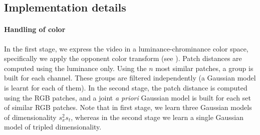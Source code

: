 \documentclass[10pt, a4paper]{article}
\begin{document}

\subsection{Implementation details}
\label{sse:implementation}

\paragraph{Handling of color} %
%
In the first stage, we express the video in a luminance-chrominance color space,
specifically we apply the opponent color transform (see \cite{Dabov2007tip,Lebrun2013a}).
Patch distances are computed using the luminance only. Using the 
$n$ most similar patches, a group is built for each channel. These
groups are filtered independently (a Gaussian model is learnt for each of them).
%
In the second stage, the patch distance is computed using the RGB patches, and
a joint \textit{a priori} Gaussian model is built for each set
of similar RGB patches. Note that in first stage, we learn three Gaussian models
of dimensionality $s_x^2s_t$, whereas in the second stage we learn a single 
Gaussian model of tripled dimensionality.
\end{document}
